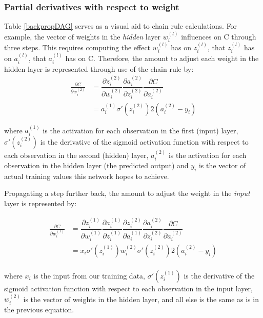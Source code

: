 \subsubsection{Partial derivatives with respect to
weight}

Table \ref{backpropDAG} serves as a visual aid to chain rule calculations.  For example, the vector of weights in the \textit{hidden} layer $w_i^{(l)}$ influences on C through three steps.  This requires computing the effect $w_i^{(l)}$ has on $z_i^{(l)}$, that $z_i^{(l)}$ has on $a_i^{(l)}$, that $a_i^{(l)}$ has on C.  
Therefore, the amount to adjust each weight in the hidden layer is
represented through use of the chain rule by:
\begin{align*}
\frac{\partial{C}}{\partial{w_i^{(2)}}}    &=  \dfrac{\partial{z_i^{(2)}}}{\partial{w_i^{(2)}}}
     \dfrac{\partial{a_i^{(2)}}}{\partial{z_i^{(2)}}}
     \dfrac{\partial{C}}{\partial{a_i^{(2)}}} \\ 
 &= a_i^{(1)} \sigma'(z_i^{(2)}) 2(a_i^{(2)}-y_i) \end{align*}

where \(a_i^{(1)}\) is the activation for each observation in the first
(input) layer, \(\sigma'(z_i^{(2)})\) is the derivative of the sigmoid
activation function with respect to each observation in the second
(hidden) layer, \(a_i^{(2)}\) is the activation for each observation in
the hidden layer (the predicted output) and \(y_i\) is the vector of actual training values
this network hopes to achieve.

Propagating a step further back, the amount to adjust the weight in the \emph{input} layer is
represented by:

    \begin{align*}
\frac{\partial{C}}{\partial{w_i^{(1)}}}    &= \dfrac{\partial{z_i^{(1)}}}{\partial{w_i^{(1)}}} \dfrac{\partial{a_i^{(1)}}}{\partial{z_i^{(1)}}}  \dfrac{\partial{z_i^{(2)}}}{\partial{a_i^{(1)}}}
     \dfrac{\partial{a_i^{(2)}}}{\partial{z_i^{(2)}}}
     \dfrac{\partial{C}}{\partial{a_i^{(2)}}} \\    
&= x_i \sigma'(z_i^{(1)}) w_i^{(2)} \sigma'(z_i^{(2)}) 2(a_i^{(2)}-y_i) \\
     \end{align*}

where \(x_i\) is the input from our training data,
\(\sigma'(z_i^{(1)})\) is the derivative of the sigmoid activation
function with respect to each observation in the input layer,
\(w_i^{(2)}\) is the vector of weights in the hidden layer, and all else
is the same as is in the previous equation.

